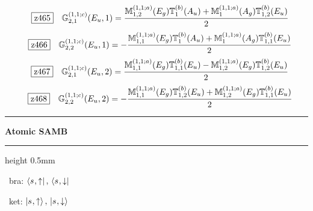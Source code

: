 \documentclass[fleqn,10pt,landscape]{jsarticle}
\begin{document}
\begin{dmath*}
\hspace*{3mm}\fbox{z465}\quad \mathbb{G}_{2,1}^{(1,1;c)}(E_{u},1)=\frac{\mathbb{M}_{1,2}^{(1,1;a)}(E_{g}) \mathbb{T}_{1}^{(b)}(A_{u}) + \mathbb{M}_{1}^{(1,1;a)}(A_{g}) \mathbb{T}_{1,2}^{(b)}(E_{u})}{2}
\end{dmath*}
\begin{dmath*}
\hspace*{3mm}\fbox{z466}\quad \mathbb{G}_{2,2}^{(1,1;c)}(E_{u},1)=- \frac{\mathbb{M}_{1,1}^{(1,1;a)}(E_{g}) \mathbb{T}_{1}^{(b)}(A_{u}) + \mathbb{M}_{1}^{(1,1;a)}(A_{g}) \mathbb{T}_{1,1}^{(b)}(E_{u})}{2}
\end{dmath*}
\begin{dmath*}
\hspace*{3mm}\fbox{z467}\quad \mathbb{G}_{2,1}^{(1,1;c)}(E_{u},2)=\frac{\mathbb{M}_{1,1}^{(1,1;a)}(E_{g}) \mathbb{T}_{1,1}^{(b)}(E_{u}) - \mathbb{M}_{1,2}^{(1,1;a)}(E_{g}) \mathbb{T}_{1,2}^{(b)}(E_{u})}{2}
\end{dmath*}
\begin{dmath*}
\hspace*{3mm}\fbox{z468}\quad \mathbb{G}_{2,2}^{(1,1;c)}(E_{u},2)=- \frac{\mathbb{M}_{1,1}^{(1,1;a)}(E_{g}) \mathbb{T}_{1,2}^{(b)}(E_{u}) + \mathbb{M}_{1,2}^{(1,1;a)}(E_{g}) \mathbb{T}_{1,1}^{(b)}(E_{u})}{2}
\end{dmath*}
\vspace{5mm}

\vspace{5mm}
\noindent \rule[0.5mm]{5mm}{0.5mm}\hspace{3mm}\textbf{Atomic SAMB}\hspace{3mm}\leaders\hrule height 0.5mm\hfill\kern0pt
\vspace{3mm}

\vspace{5mm}

\noindent\textbullet\, bra: $\bra{s_{},\uparrow},\, \bra{s_{},\downarrow}$

\noindent\textbullet\, ket: $\ket{s_{},\uparrow},\, \ket{s_{},\downarrow}$
\end{document}

